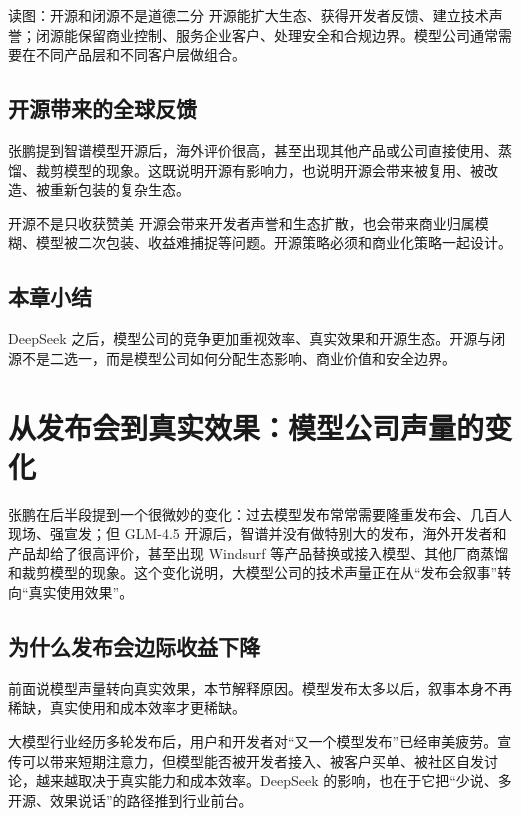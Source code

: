 \documentclass[a4paper]{article}
\begin{document}
\begin{knowledgebox}{读图：开源和闭源不是道德二分}
开源能扩大生态、获得开发者反馈、建立技术声誉；闭源能保留商业控制、服务企业客户、处理安全和合规边界。模型公司通常需要在不同产品层和不同客户层做组合。
\end{knowledgebox}

\subsection{开源带来的全球反馈}

张鹏提到智谱模型开源后，海外评价很高，甚至出现其他产品或公司直接使用、蒸馏、裁剪模型的现象。这既说明开源有影响力，也说明开源会带来被复用、被改造、被重新包装的复杂生态。

\begin{warningbox}{开源不是只收获赞美}
开源会带来开发者声誉和生态扩散，也会带来商业归属模糊、模型被二次包装、收益难捕捉等问题。开源策略必须和商业化策略一起设计。
\end{warningbox}

\subsection{本章小结}

DeepSeek 之后，模型公司的竞争更加重视效率、真实效果和开源生态。开源与闭源不是二选一，而是模型公司如何分配生态影响、商业价值和安全边界。

\section{从发布会到真实效果：模型公司声量的变化}

张鹏在后半段提到一个很微妙的变化：过去模型发布常常需要隆重发布会、几百人现场、强宣发；但 GLM-4.5 开源后，智谱并没有做特别大的发布，海外开发者和产品却给了很高评价，甚至出现 Windsurf 等产品替换或接入模型、其他厂商蒸馏和裁剪模型的现象。这个变化说明，大模型公司的技术声量正在从“发布会叙事”转向“真实使用效果”。

\subsection{为什么发布会边际收益下降}

前面说模型声量转向真实效果，本节解释原因。模型发布太多以后，叙事本身不再稀缺，真实使用和成本效率才更稀缺。

大模型行业经历多轮发布后，用户和开发者对“又一个模型发布”已经审美疲劳。宣传可以带来短期注意力，但模型能否被开发者接入、被客户买单、被社区自发讨论，越来越取决于真实能力和成本效率。DeepSeek 的影响，也在于它把“少说、多开源、效果说话”的路径推到行业前台。
\end{document}
